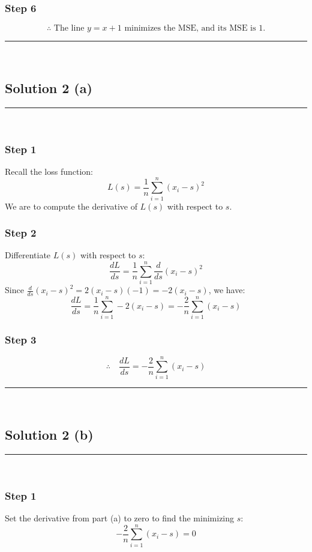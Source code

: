 \documentclass{article}
\begin{document}
\subsubsection*{Step 6}
\parbox{\textwidth}{
\[
\therefore \text{ The line } y = x + 1 \text{ minimizes the MSE, and its MSE is } 1.
\]
}

\noindent\rule{\textwidth}{0.4pt}\\

\newpage

\subsection*{Solution 2 (a)}
\noindent\rule{\textwidth}{0.4pt}\\

\subsubsection*{Step 1}
\parbox{\textwidth}{
Recall the loss function:
\[
L(s) = \frac{1}{n} \sum_{i=1}^{n} (x_{i} - s)^{2}
\]
We are to compute the derivative of $L(s)$ with respect to $s$.
}

\subsubsection*{Step 2}
\parbox{\textwidth}{
Differentiate $L(s)$ with respect to $s$:
\[
\frac{dL}{ds} = \frac{1}{n} \sum_{i=1}^{n} \frac{d}{ds} (x_i - s)^2
\]
Since $\frac{d}{ds} (x_i - s)^2 = 2(x_i - s)(-1) = -2(x_i - s)$, we have:
\[
\frac{dL}{ds} = \frac{1}{n} \sum_{i=1}^{n} -2(x_i - s) = -\frac{2}{n} \sum_{i=1}^{n} (x_i - s)
\]
}

\subsubsection*{Step 3}
\parbox{\textwidth}{
\[
\therefore \quad \frac{dL}{ds} = -\frac{2}{n} \sum_{i=1}^{n} (x_i - s)
\]
}

\noindent\rule{\textwidth}{0.4pt}\\

\newpage

\subsection*{Solution 2 (b)}
\noindent\rule{\textwidth}{0.4pt}\\

\subsubsection*{Step 1}
\parbox{\textwidth}{
Set the derivative from part (a) to zero to find the minimizing $s$:
\[
-\frac{2}{n} \sum_{i=1}^{n} (x_i - s) = 0
\]
}
\end{document}
